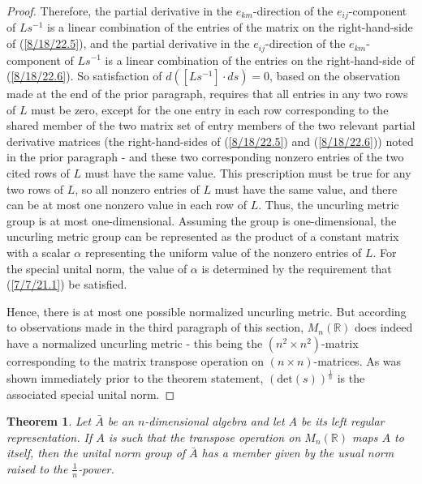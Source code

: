 \documentclass{amsart}
\numberwithin{equation}{section}
\newtheorem{theorem}{Theorem}
\theoremstyle{definition}
\numberwithin{theorem}{section}
\begin{document}
\begin{proof}
Therefore, the partial derivative in the $e_{km}$-direction of the $e_{ij}$-component of $Ls^{-1}$ is a linear combination of the entries of the matrix on the right-hand-side of (\ref{8/18/22.5}), and  the partial derivative in the $e_{ij}$-direction of the $e_{km}$-component of $Ls^{-1}$ is a linear combination of the entries on the right-hand-side of (\ref{8/18/22.6}).
So satisfaction of $d\left([Ls^{-1}]\cdot ds\right) = 0$, based on the observation made at the end of the prior paragraph, requires that all entries in any two rows of $L$ must be zero, except for the one entry in each row corresponding to the shared member of the two matrix set of entry members of the two relevant partial derivative matrices (the right-hand-sides of (\ref{8/18/22.5}) and (\ref{8/18/22.6})) noted in the prior paragraph - and these two corresponding nonzero entries of the two cited rows of $L$ must have the same value.  This prescription must be true for any two rows of $L$, so all nonzero entries of $L$ must have the same value, and there can be at most one nonzero value in each row of $L$.  Thus, the uncurling metric group is at most one-dimensional. Assuming the group is one-dimensional, the uncurling metric group can be represented as the product of a constant matrix with a scalar $\alpha$ representing the uniform value of the nonzero entries of $L$.  
For the special unital norm, the value of $\alpha$ is determined by the requirement that (\ref{7/7/21.1}) be satisfied. 

Hence, there is at most one possible normalized uncurling metric.  But according to observations made in the third paragraph of this section, $ M_n(\mathbb{R})$ does indeed have a normalized uncurling metric - this being the $(n^2\times n^2)$-matrix corresponding to the matrix transpose operation on $(n\times n)$-matrices.  As was shown immediately prior to the theorem statement, $(\mbox{det}(s))^{\frac{1}{n}}$ is the associated special unital norm.  
 \end{proof}
 
 \begin{theorem}\label{5/13/22.1} Let $\bar{A}$ be an $n$-dimensional algebra and let $A$ be its left regular representation.  If $A$ is such that the transpose operation on $ M_n(\mathbb{R})$ maps $A$ to itself, then the unital norm group of $\bar{A}$ has a member given by the usual norm raised to the $\frac{1}{n}$-power.   
\end{theorem}
\end{document}

